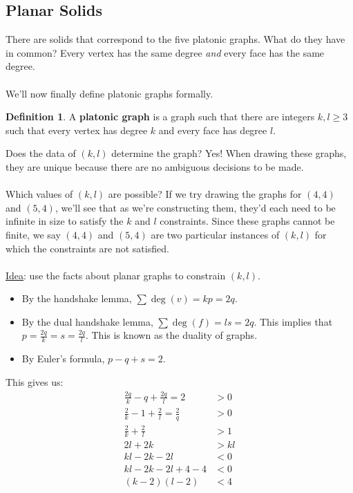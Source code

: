 \documentclass[]{article}
\theoremstyle{definition}
\newtheorem*{defn}{Definition}
\begin{document}
		\subsection{Planar Solids}
			There are solids that correspond to the five platonic graphs. What do they have in common? Every vertex has the same degree \emph{and} every face has the same degree. 
			\\ \\
			We'll now finally define platonic graphs formally.
			\begin{defn}
				A \textbf{platonic graph} is a graph such that there are integers $k, l \ge 3$ such that every vertex has degree $k$ and every face has degree $l$.
			\end{defn}

			Does the data of $(k, l)$ determine the graph? Yes! When drawing these graphs, they are unique because there are no ambiguous decisions to be made.
			\\ \\
			Which values of $(k, l)$ are possible? If we try drawing the graphs for $(4,4)$ and $(5,4)$, we'll see that as we're constructing them, they'd each need to be infinite in size to satisfy the $k$ and $l$ constraints. Since these graphs cannot be finite, we say $(4,4)$ and $(5,4)$ are two particular instances of $(k, l)$ for which the constraints are not satisfied.
			\\ \\
			\underline{Idea}: use the facts about planar graphs to constrain $(k, l)$.
			
			\begin{itemize}
				\item By the handshake lemma, $\sum \deg(v) = kp = 2q$.
				\item By the dual handshake lemma, $\sum \deg(f) = ls = 2q$. This implies that $p = \frac{2q}{k} = s = \frac{2q}{l}$. This is known as the duality of graphs.
				\item By Euler's formula, $p - q + s = 2$.
			\end{itemize}

			This gives us:
			\begin{align*}
				\frac{2q}{k} - q + \frac{2q}{l} = 2 &> 0 \\
				\frac{2}{k} - 1 + \frac{2}{l} = \frac{2}{q} &> 0 \\
				\frac{2}{k} + \frac{2}{l} &> 1 \\
				2l + 2k &> kl \\
				kl - 2k - 2l &< 0 \\
				kl - 2k - 2l + 4 - 4 &< 0 \\
				(k-2)(l-2) &< 4 
			\end{align*}
\end{document}
